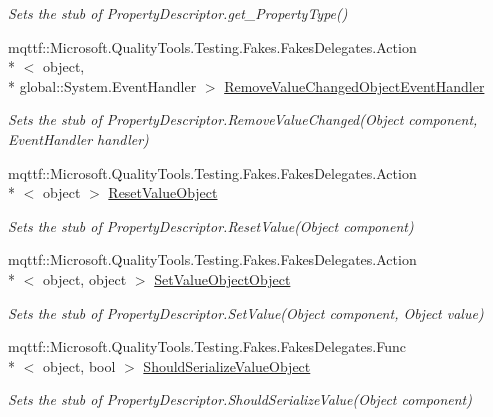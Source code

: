 \begin{DoxyCompactItemize}
\begin{DoxyCompactList}\small\item\em Sets the stub of Property\-Descriptor.\-get\-\_\-\-Property\-Type()\end{DoxyCompactList}\item 
mqttf\-::\-Microsoft.\-Quality\-Tools.\-Testing.\-Fakes.\-Fakes\-Delegates.\-Action\\*
$<$ object, \\*
global\-::\-System.\-Event\-Handler $>$ \hyperlink{class_system_1_1_component_model_1_1_fakes_1_1_stub_property_descriptor_a6405bace154bf535fea9d1789284ae62}{Remove\-Value\-Changed\-Object\-Event\-Handler}
\begin{DoxyCompactList}\small\item\em Sets the stub of Property\-Descriptor.\-Remove\-Value\-Changed(\-Object component, Event\-Handler handler)\end{DoxyCompactList}\item 
mqttf\-::\-Microsoft.\-Quality\-Tools.\-Testing.\-Fakes.\-Fakes\-Delegates.\-Action\\*
$<$ object $>$ \hyperlink{class_system_1_1_component_model_1_1_fakes_1_1_stub_property_descriptor_a812c482283892cb548afa2fbf8b6e85d}{Reset\-Value\-Object}
\begin{DoxyCompactList}\small\item\em Sets the stub of Property\-Descriptor.\-Reset\-Value(\-Object component)\end{DoxyCompactList}\item 
mqttf\-::\-Microsoft.\-Quality\-Tools.\-Testing.\-Fakes.\-Fakes\-Delegates.\-Action\\*
$<$ object, object $>$ \hyperlink{class_system_1_1_component_model_1_1_fakes_1_1_stub_property_descriptor_a59cbd940c48cea6c18f84ff32709fda3}{Set\-Value\-Object\-Object}
\begin{DoxyCompactList}\small\item\em Sets the stub of Property\-Descriptor.\-Set\-Value(\-Object component, Object value)\end{DoxyCompactList}\item 
mqttf\-::\-Microsoft.\-Quality\-Tools.\-Testing.\-Fakes.\-Fakes\-Delegates.\-Func\\*
$<$ object, bool $>$ \hyperlink{class_system_1_1_component_model_1_1_fakes_1_1_stub_property_descriptor_aaa343fe01b98a65139f86db8e3d21aa4}{Should\-Serialize\-Value\-Object}
\begin{DoxyCompactList}\small\item\em Sets the stub of Property\-Descriptor.\-Should\-Serialize\-Value(\-Object component)\end{DoxyCompactList}\item 

\end{DoxyCompactItemize}
